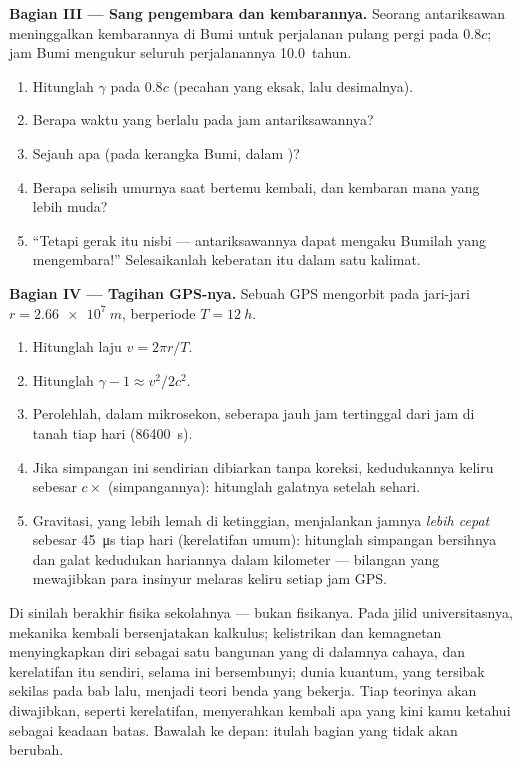 \begin{problem}
\medskip
\noindent\textbf{Bagian III --- Sang pengembara dan kembarannya.}
Seorang antariksawan meninggalkan kembarannya di Bumi untuk perjalanan pulang pergi pada $0.8c$; jam
Bumi mengukur seluruh perjalanannya \qty{10.0}{tahun}.
\begin{enumerate}[resume]
  \item Hitunglah $\gamma$ pada $0.8c$ (pecahan yang eksak, lalu desimalnya).
  \item Berapa waktu yang berlalu pada jam antariksawannya?
  \item Sejauh apa  (pada kerangka Bumi, dalam )?
  \item Berapa selisih umurnya saat bertemu kembali, dan kembaran mana yang lebih muda?
  \item ``Tetapi gerak itu nisbi --- antariksawannya dapat mengaku Bumilah yang
        mengembara!'' Selesaikanlah keberatan itu dalam satu kalimat.
\end{enumerate}

\medskip
\noindent\textbf{Bagian IV --- Tagihan GPS-nya.}
Sebuah  GPS mengorbit pada jari-jari $r = \qty{2.66e7}{m}$, berperiode $T = \qty{12}{h}$.
\begin{enumerate}[resume]
  \item Hitunglah laju  $v = 2\pi r/T$.
  \item Hitunglah $\gamma - 1 \approx v^2/2c^2$.
  \item Perolehlah, dalam mikrosekon, seberapa jauh jam  tertinggal
        dari jam di tanah tiap hari (\qty{86400}{s}).
  \item Jika simpangan ini sendirian dibiarkan tanpa koreksi, kedudukannya keliru sebesar
        $c \times$ (simpangannya): hitunglah galatnya setelah sehari.
  \item Gravitasi, yang lebih lemah di ketinggian, menjalankan jamnya \emph{lebih cepat} sebesar
        \qty{45}{\micro s} tiap hari (kerelatifan umum): hitunglah simpangan
        bersihnya dan galat kedudukan hariannya dalam kilometer --- bilangan
        yang mewajibkan para insinyur melaras keliru setiap jam GPS.
\end{enumerate}
\end{problem}

\bigskip
\noindent
Di sinilah berakhir fisika sekolahnya --- bukan fisikanya. Pada jilid
universitasnya, mekanika kembali bersenjatakan kalkulus; kelistrikan dan kemagnetan
menyingkapkan diri sebagai satu bangunan yang di dalamnya cahaya, dan kerelatifan itu sendiri,
selama ini bersembunyi; dunia kuantum, yang tersibak sekilas pada bab lalu, menjadi
teori benda yang bekerja. Tiap teorinya akan diwajibkan, seperti kerelatifan,
menyerahkan kembali apa yang kini kamu ketahui sebagai keadaan batas. Bawalah ke depan:
itulah bagian yang tidak akan berubah.
